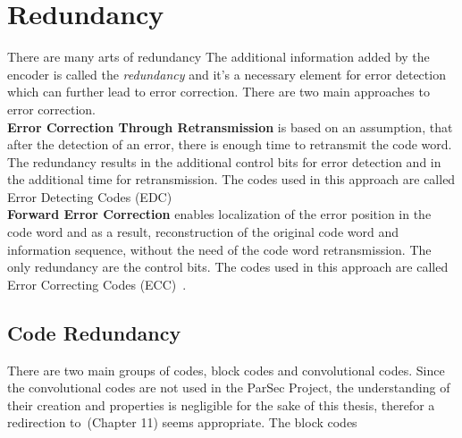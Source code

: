 \documentclass[]{myclass}
\begin{document}
\section{Redundancy} \label{sec:red}
There are many arts of redundancy 
The additional information added by the encoder is called the \textit{redundancy} and it's a necessary element for error detection which can further lead to error correction. There are two main approaches to error correction.\\[\baselineskip]
\textbf{Error Correction Through Retransmission} is based on an assumption, that after the detection of an error, there is enough time to retransmit the code word. The redundancy results in the additional control bits for error detection and in the additional time for retransmission. The codes used in this approach are called Error Detecting Codes (EDC)\\[\baselineskip]
\textbf{Forward Error Correction} enables localization of the error position in the code word and as a result, reconstruction of the original code word and information sequence, without the need of the code word retransmission. The only redundancy are the control bits. The codes used in this approach are called Error Correcting Codes (ECC)~\cite{book:SchonfeldKlimant}.\\

\subsection{Code Redundancy}\label{sub:red}

There are two main groups of codes, block codes and convolutional codes. Since the convolutional codes are not used in the ParSec Project, the understanding of their creation and properties is negligible for the sake of this thesis, therefor a redirection to~\cite{book:Lint}(Chapter 11) seems appropriate.
The block codes


\cleardoublepage
\appendix%

%
{}
\cleardoublepage


\end{document}
